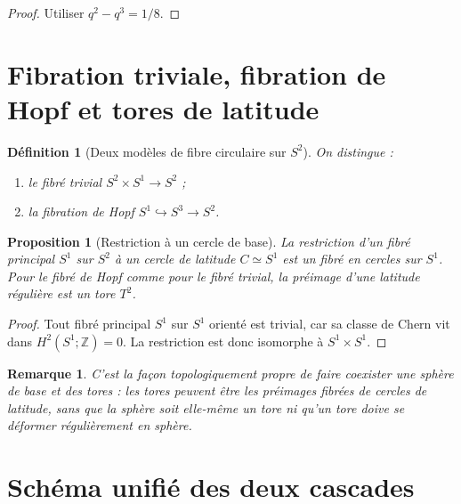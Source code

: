 \documentclass[11pt,a4paper]{article}
\newtheorem{proposition}[theorem]{Proposition}
\newtheorem{definition}[theorem]{Définition}
\newtheorem{remark}[theorem]{Remarque}
\newcommand{\Z}{\mathbb Z}
\begin{document}
\begin{proof}
Utiliser $q^2-q^3=1/8$.
\end{proof}

\section{Fibration triviale, fibration de Hopf et tores de latitude}

\begin{definition}[Deux modèles de fibre circulaire sur $S^2$]
On distingue :
\begin{enumerate}[label=\textup{(\roman*)}]
\item le fibré trivial $S^2\times S^1\to S^2$ ;
\item la fibration de Hopf $S^1\hookrightarrow S^3\to S^2$.
\end{enumerate}
\end{definition}

\begin{proposition}[Restriction à un cercle de base]
La restriction d'un fibré principal $S^1$ sur $S^2$ à un cercle de latitude $C\simeq S^1$ est un fibré en cercles sur $S^1$. Pour le fibré de Hopf comme pour le fibré trivial, la préimage d'une latitude régulière est un tore $T^2$.
\end{proposition}

\begin{proof}
Tout fibré principal $S^1$ sur $S^1$ orienté est trivial, car sa classe de Chern vit dans $H^2(S^1;\Z)=0$. La restriction est donc isomorphe à $S^1\times S^1$.
\end{proof}

\begin{remark}
C'est la façon topologiquement propre de faire coexister une sphère de base et des tores : les tores peuvent être les préimages fibrées de cercles de latitude, sans que la sphère soit elle-même un tore ni qu'un tore doive se déformer régulièrement en sphère.
\end{remark}

\section{Schéma unifié des deux cascades}
\end{document}
